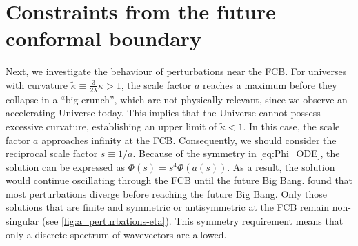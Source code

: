 \documentclass[%
 reprint,
 amsmath,amssymb,
 prl,
]{revtex4-2}
\begin{document}
\section{Constraints from the future conformal boundary}\label{sec:constrain_FCB}
Next, we investigate the behaviour of perturbations near the FCB.  For universes with curvature \( \tilde{\kappa} \equiv \frac{3}{2\lambda}\kappa > 1 \), the scale factor \(a\) reaches a maximum before they collapse in a ``big crunch'', which are not physically relevant, since we observe an accelerating Universe today. This implies that the Universe cannot possess excessive curvature, establishing an upper limit of \(\tilde{\kappa} < 1\). In this case, the scale factor \(a\) approaches infinity at the FCB.
Consequently, we should consider the reciprocal scale factor \( s \equiv 1/a \). Because of the symmetry in \cref{eq:Phi_ODE}, the solution can be expressed as \(\Phi(s)= s^4 \Phi(a(s)) \). As a result, the solution would continue oscillating through the FCB until the future Big Bang. \citet{2022PhRvD.105h3514L} found that most perturbations diverge before reaching the future Big Bang. Only those solutions that are finite and symmetric or antisymmetric at the FCB remain non-singular (see \cref{fig:a_perturbations-eta}). This symmetry requirement means that only a discrete spectrum of wavevectors are allowed.
\end{document}
